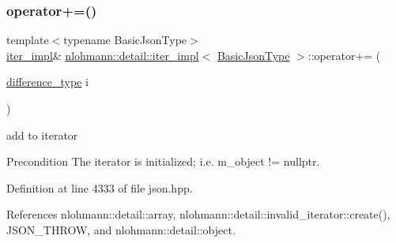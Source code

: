\subsubsection{\texorpdfstring{operator+=()}{operator+=()}}
{\footnotesize\ttfamily template$<$typename Basic\+Json\+Type$>$ \\
\hyperlink{classnlohmann_1_1detail_1_1iter__impl}{iter\+\_\+impl}\& \hyperlink{classnlohmann_1_1detail_1_1iter__impl}{nlohmann\+::detail\+::iter\+\_\+impl}$<$ \hyperlink{classnlohmann_1_1detail_1_1iter__impl_abf18f18793f84b0222aebb5a2a87da7a}{Basic\+Json\+Type} $>$\+::operator+= (\begin{DoxyParamCaption}\item[{\hyperlink{classnlohmann_1_1detail_1_1iter__impl_a2f7ea9f7022850809c60fc3263775840}{difference\+\_\+type}}]{i }\end{DoxyParamCaption})\hspace{0.3cm}{\ttfamily [inline]}}



add to iterator 

\begin{DoxyPrecond}{Precondition}
The iterator is initialized; i.\+e. {\ttfamily m\+\_\+object != nullptr}. 
\end{DoxyPrecond}


Definition at line 4333 of file json.\+hpp.



References nlohmann\+::detail\+::array, nlohmann\+::detail\+::invalid\+\_\+iterator\+::create(), J\+S\+O\+N\+\_\+\+T\+H\+R\+OW, and nlohmann\+::detail\+::object.


